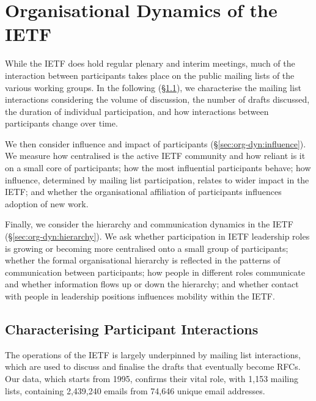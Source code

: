 \documentclass[twocolumn,10pt]{article}
\begin{document}
\section{Organisational Dynamics of the IETF}
\label{sec:org-dyn}

While the IETF does hold regular plenary and interim meetings, much of the
interaction between participants takes place on the public mailing lists of
the various working groups. In the following (\S\ref{sec:org-dyn:participants}),
we characterise the mailing list interactions considering the volume of
discussion, the number of drafts discussed, the duration of individual
participation, and how interactions between participants change over time.

We then consider influence and impact of participants (\S\ref{sec:org-dyn:influence}).
We measure how centralised is the active IETF community and how reliant is
it on a small core of participants; how the most influential participants
behave; how influence, determined by mailing list participation, relates to
wider impact in the IETF; and whether the organisational affiliation of
participants influences adoption of new work.

Finally, we consider the hierarchy and communication dynamics in the IETF
(\S\ref{sec:org-dyn:hierarchy}). We ask whether participation in IETF
leadership roles is growing or becoming more centralised onto a small group
of participants; whether the formal organisational hierarchy is reflected
in the patterns of communication between participants; how people in
different roles communicate and whether information flows up or down the
hierarchy; and whether contact with people in leadership positions
influences mobility within the IETF.

\subsection{Characterising Participant Interactions}
\label{sec:org-dyn:participants}


The operations of the IETF is largely underpinned by mailing list
interactions, which are used to discuss and finalise the drafts that
eventually become RFCs. Our data, which starts from 1995, confirms their
vital role, with 1,153 mailing lists, containing 2,439,240 emails from
74,646 unique email addresses.
\end{document}
